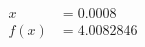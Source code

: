 \documentclass[preview]{standalone}
\begin{document}
\begin{align*}
x &= 0.0008\\f(x) &= 4.0082846
\end{align*}
\end{document}
